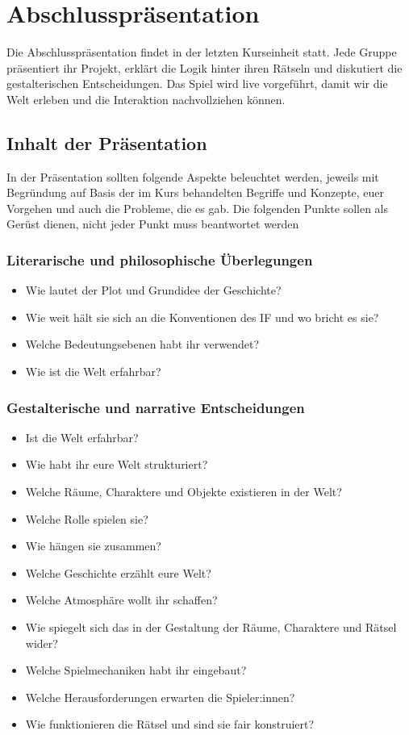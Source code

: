 \documentclass[parskip=half,a4paper,11pt]{scrreprt}
\begin{document}
\section{Abschlusspräsentation}

Die Abschlusspräsentation findet in der letzten Kurseinheit statt. Jede Gruppe präsentiert ihr Projekt, erklärt die Logik hinter ihren Rätseln und diskutiert die gestalterischen Entscheidungen. Das Spiel wird live vorgeführt, damit wir die Welt erleben und die Interaktion nachvollziehen können.

\subsection{Inhalt der Präsentation}

In der Präsentation sollten folgende Aspekte beleuchtet werden, jeweils mit Begründung auf Basis der im Kurs behandelten Begriffe und Konzepte, euer Vorgehen und auch die Probleme, die es gab. Die folgenden Punkte sollen als Gerüst dienen, nicht jeder Punkt muss beantwortet werden

\subsubsection{Literarische und philosophische Überlegungen}

\begin{itemize}
    \item Wie lautet der Plot und Grundidee der Geschichte?
    \item Wie weit hält sie sich an die Konventionen des IF und wo bricht es sie?
    \item Welche Bedeutungsebenen habt ihr verwendet?
    \item Wie ist die Welt erfahrbar? 
\end{itemize}

\subsubsection{Gestalterische und narrative Entscheidungen}

\begin{itemize}
    \item Ist die Welt erfahrbar? 
    \item Wie habt ihr eure Welt strukturiert? 
    \item Welche Räume, Charaktere und Objekte existieren in der Welt? 
    \item Welche Rolle spielen sie?
    \item Wie hängen sie zusammen? 
    \item Welche Geschichte erzählt eure Welt? 
    \item Welche Atmosphäre wollt ihr schaffen? 
    \item Wie spiegelt sich das in der Gestaltung der Räume, Charaktere und Rätsel wider?
    \item Welche Spielmechaniken habt ihr eingebaut?
    \item Welche Herausforderungen erwarten die Spieler:innen?
    \item Wie funktionieren die Rätsel und sind sie fair konstruiert?
\end{itemize}
\end{document}
